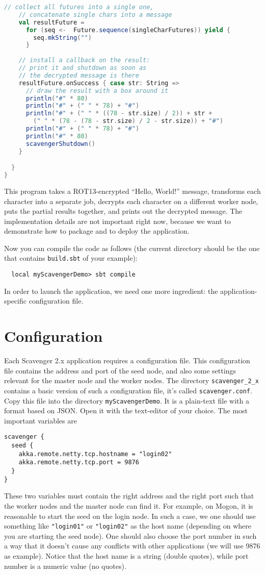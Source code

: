 \documentclass{scrbook}
\begin{document}
\begin{lstlisting}[language=scala]
    // collect all futures into a single one, 
    // concatenate single chars into a message
    val resultFuture = 
      for (seq <-  Future.sequence(singleCharFutures)) yield {
        seq.mkString("")
      }
    
    // install a callback on the result: 
    // print it and shutdown as soon as
    // the decrypted message is there
    resultFuture.onSuccess { case str: String =>
      // draw the result with a box around it
      println("#" * 80)
      println("#" + (" " * 78) + "#")
      println("#" + (" " * ((78 - str.size) / 2)) + str + 
        (" " * (78 - (78 - str.size) / 2 - str.size)) + "#") 
      println("#" + (" " * 78) + "#")
      println("#" * 80)
      scavengerShutdown()
    }

  }
}
\end{lstlisting}
This program takes a ROT13-encrypted ``Hello, World!'' message, transforms 
each character into a separate job, decrypts each character on a different
worker node, puts the partial results together, and prints out the decrypted
message. 
The implementation details are not important right now, because we want to 
demonstrate how to package and to deploy the application.

Now you can compile the code as follows (the current directory should be the
one that contains \lstinline{build.sbt} of your example):
\begin{lstlisting}
  local myScavengerDemo> sbt compile
\end{lstlisting}
In order to launch the application, we need one more ingredient: 
the application-specific configuration file.

\section{Configuration}
Each Scavenger 2.x application requires a configuration file. 
This configuration file contains the address and port of the seed node, and
also some settings relevant for the master node and the worker nodes.
The directory \lstinline{scavenger_2_x} contains a basic version of such a 
configuration file, it's called \lstinline{scavenger.conf}. 
Copy this file into the directory \lstinline{myScavengerDemo}. 
It is a plain-text file with a format based on JSON. 
Open it with the text-editor of your choice. The most important variables 
are 
\begin{lstlisting}
scavenger {
  seed {
    akka.remote.netty.tcp.hostname = "login02"
    akka.remote.netty.tcp.port = 9876
  }
}
\end{lstlisting}
These two variables must contain the right address and the right port such that
the worker nodes and the master node can find it. 
For example, on Mogon, it is reasonable to start the seed on the login node. 
In such a case, we one should use something like
\lstinline{"login01"} or \lstinline{"login02"}
as the host name (depending on where you are starting the
seed node). One should also choose the port number 
in such a way that it doesn't cause any conflicts with 
other applications (we will use 9876 as example).
Notice that the host name is a string (double quotes), 
while port number is a numeric value (no quotes).
\end{document}
